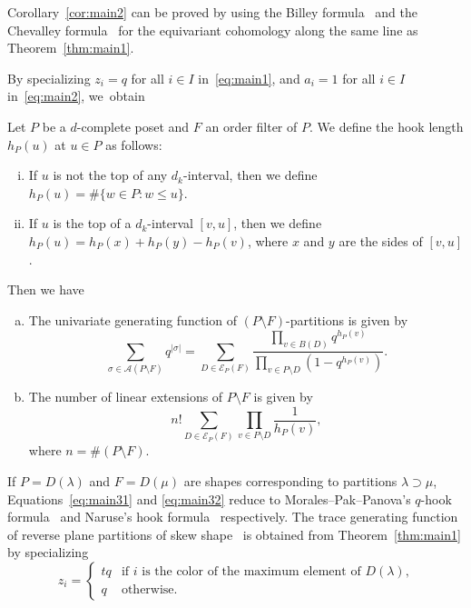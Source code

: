 \documentclass[ALCO,ThmDefs,Unicode,epreuves]{cedram}
\newcommand\AP{\mathcal{A}}
\newcommand\EE{\mathcal{E}}
\begin{document}
\begin{rema}
Corollary~\ref{cor:main2} can be proved by using the Billey formula~\cite[Theorem~4]{B} 
and the Chevalley formula~\cite[Theorem~11.1.7 and Corollary~11.3.17]{Ku} 
for the equivariant cohomology along the same line as Theorem~\ref{thm:main1}.
\end{rema}

By specializing $z_i = q$ for all $i \in I$ in~\eqref{eq:main1}, 
and $a_i = 1$ for all $i \in I$ in~\eqref{eq:main2}, we~obtain

\begin{coro}
\label{cor:main3}
Let $P$ be a $d$-complete poset and $F$ an order filter of $P$.
We define the hook length $h_P(u)$ at $u \in P$ as follows:
\begin{enumerate}[(i)]
\item\label{coro5.6_i} %
If $u$ is not the top of any $d_k$-interval, then we define $h_P(u) = \# \{ w \in P : w \le u \}$.
\item\label{coro5.6_ii} %
If $u$ is the top of a $d_k$-interval $[v,u]$, then we define 
$h_P(u) = h_P(x) + h_P(y) - h_P(v)$, 
where $x$ and $y$ are the sides of $[v,u]$.
\end{enumerate}
Then we have
\begin{enumerate}[(a)]
\item\label{coro5.6_a} %
The univariate generating function of $(P \setminus F)$-partitions is given by
\begin{equation}
\label{eq:main31}
\sum_{\sigma \in \AP(P \setminus F)}
 q^{|\sigma|}
 =
\sum_{D \in \EE_P(F)}
\frac{ \prod_{v \in B(D)} q^{h_P(v)} }
         { \prod_{v \in P \setminus D} (1-q^{h_P(v)}) }.
\end{equation}
\item\label{coro5.6_b} %
The number of linear extensions of $P \setminus F$ is given by
\begin{equation}
\label{eq:main32}
n! \sum_{D \in \EE_P(F)} \prod_{v \in P \setminus D} \frac{1}{h_P(v)},
\end{equation}
where $n = \# (P \setminus F)$.
\end{enumerate}
\end{coro}

If $P = D(\lambda)$ and $F = D(\mu)$ are shapes corresponding to partitions $\lambda \supset \mu$,
Equations~\eqref{eq:main31} and \eqref{eq:main32} reduce to 
Morales--Pak--Panova's $q$-hook formula~\cite[Corollary~6.17]{MPP} and Naruse's hook formula~\cite{Naruse} 
respectively.
The trace generating function of reverse plane partitions of skew shape~\cite[Corollary~6.20]{MPP}
is obtained from Theorem~\ref{thm:main1} by specializing
$$
z_i = \begin{cases}
 tq &\text{if $i$ is the color of the maximum element of $D(\lambda)$,} \\
 q &\text{otherwise.}
\end{cases}
$$
\end{document}
